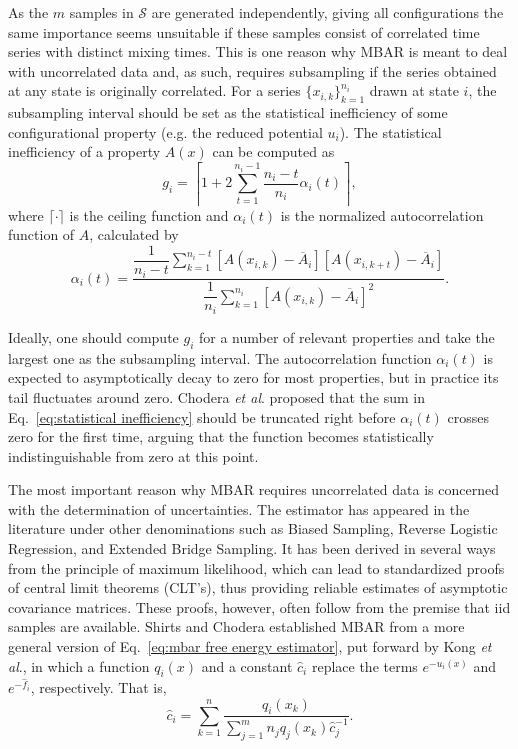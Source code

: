 \documentclass[aip,jcp,reprint,amsmath,amssymb]{revtex4-1}
\begin{document}
As the $m$ samples in $\mathcal S$ are generated independently, giving all configurations the same importance seems unsuitable if these samples consist of correlated time series with distinct mixing times. This is one reason why MBAR is meant to deal with uncorrelated data and, as such, requires subsampling if the series obtained at any state is originally correlated.\cite{Shirts_2008} For a series $\{x_{i,k}\}_{k=1}^{n_i}$ drawn at state $i$, the subsampling interval should be set as the statistical inefficiency of some configurational property (e.g. the reduced potential $u_i$). The statistical inefficiency of a property $A(x)$ can be computed as\cite{Chodera_2007}
\begin{equation}
\label{eq:statistical inefficiency}
g_i = \left\lceil 1 + 2 \sum\limits_{t=1}^{n_i-1} \frac{n_i - t}{n_i} \alpha_i(t) \right\rceil,
\end{equation}
where $\lceil \cdot \rceil$ is the ceiling function and $\alpha_i(t)$ is the normalized autocorrelation function of $A$, calculated by
\begin{equation*}
\alpha_i(t) = \frac{\dfrac{1}{n_i - t} \sum\limits_{k=1}^{n_i-t} [A(x_{i,k}) - \overline A_i][A(x_{i,k+t}) - \overline A_i]}{\dfrac{1}{n_i} \sum\limits_{k=1}^{n_i} [A(x_{i,k}) - \overline A_i]^2}.
\end{equation*}

Ideally, one should compute $g_i$ for a number of relevant properties and take the largest one as the subsampling interval.\cite{Shirts_2008} The autocorrelation function $\alpha_i(t)$ is expected to asymptotically decay to zero for most properties, but in practice its tail fluctuates around zero. Chodera \textit{et al}.\cite{Chodera_2007} proposed that the sum in Eq.~\eqref{eq:statistical inefficiency} should be truncated right before $\alpha_i(t)$ crosses zero for the first time, arguing that the function becomes statistically indistinguishable from zero at this point.

The most important reason why MBAR requires uncorrelated data is concerned with the determination of uncertainties. The estimator has appeared in the literature under other denominations such as Biased Sampling,\cite{Vardi_1985, *Gill_1988} Reverse Logistic Regression,\cite{Geyer_1994} and Extended Bridge Sampling.\cite{Meng_1996, Kong_2003, Tan_2004} It has been derived in several ways from the principle of maximum likelihood, which can lead to standardized proofs of central limit theorems (CLT's), thus providing reliable estimates of asymptotic covariance matrices.\cite{Pawitan_2001, Greene_2012} These proofs, however, often follow from the premise that iid samples are available. Shirts and Chodera\cite{Shirts_2008} established MBAR from a more general version of Eq.~\eqref{eq:mbar free energy estimator}, put forward by Kong \textit{et al}.,\cite{Kong_2003} in which a function $q_i(x)$ and a constant $\hat c_i$ replace the terms $e^{-u_i(x)}$ and $e^{-\hat f_i}$, respectively. That is,
\begin{equation}
\label{eq:kong et al estimator}
\hat c_i = \sum_{k=1}^n \frac{q_i(x_k)}{\sum_{j=1}^m n_j q_j(x_k) \hat c_j^{-1}}.
\end{equation}
\end{document}

